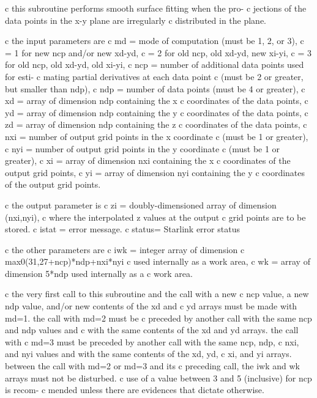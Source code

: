 \documentclass[11pt,twoside,nolof]{starlink}
\begin{document}


\begin{terminalv}
c this subroutine performs smooth surface fitting when the pro-
c jections of the data points in the x-y plane are irregularly
c distributed in the plane.

c the input parameters are
c     md  = mode of computation (must be 1, 2, or 3),
c         = 1 for new ncp and/or new xd-yd,
c         = 2 for old ncp, old xd-yd, new xi-yi,
c         = 3 for old ncp, old xd-yd, old xi-yi,
c     ncp = number of additional data points used for esti-
c           mating partial derivatives at each data point
c           (must be 2 or greater, but smaller than ndp),
c     ndp = number of data points (must be 4 or greater),
c     xd  = array of dimension ndp containing the x
c           coordinates of the data points,
c     yd  = array of dimension ndp containing the y
c           coordinates of the data points,
c     zd  = array of dimension ndp containing the z
c           coordinates of the data points,
c     nxi = number of output grid points in the x coordinate
c           (must be 1 or greater),
c     nyi = number of output grid points in the y coordinate
c           (must be 1 or greater),
c     xi  = array of dimension nxi containing the x
c           coordinates of the output grid points,
c     yi  = array of dimension nyi containing the y
c           coordinates of the output grid points.

c the output parameter is
c     zi  = doubly-dimensioned array of dimension (nxi,nyi),
c           where the interpolated z values at the output
c           grid points are to be stored.
c     istat = error message.
c     status= Starlink error status

c the other parameters are
c     iwk = integer array of dimension
c              max0(31,27+ncp)*ndp+nxi*nyi
c           used internally as a work area,
c     wk  = array of dimension 5*ndp used internally as a
c           work area.

c the very first call to this subroutine and the call with a new
c ncp value, a new ndp value, and/or new contents of the xd and
c yd arrays must be made with md=1.  the call with md=2 must be
c preceded by another call with the same ncp and ndp values and
c with the same contents of the xd and yd arrays.  the call with
c md=3 must be preceded by another call with the same ncp, ndp,
c nxi, and nyi values and with the same contents of the xd, yd,
c xi, and yi arrays.  between the call with md=2 or md=3 and its
c preceding call, the iwk and wk arrays must not be disturbed.
c use of a value between 3 and 5 (inclusive) for ncp is recom-
c mended unless there are evidences that dictate otherwise.


\end{terminalv}
\end{document}
